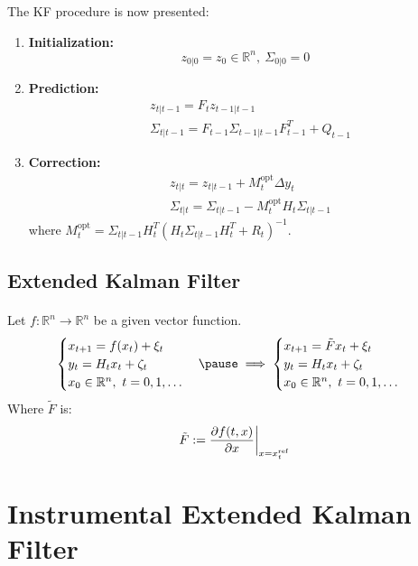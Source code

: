 \documentclass{beamer}
\theoremstyle{definition}
\theoremstyle{remark}
\theoremstyle{example}
\newif\ifinsection
\newif\ifinsubsection
\let\oldsection\section
\renewcommand{\section}{%
  \global\insectiontrue%
  \global\insubsectionfalse%
  \oldsection}
\let\oldsubsection\subsection
\renewcommand{\subsection}{%
  \global\insubsectiontrue%
  \oldsubsection}
\newcommand {\aframe}[1] {%
  \begin{frame}
    \ifinsection\frametitle{\secname}\fi
    \ifinsubsection\framesubtitle{\subsecname}\fi
  #1
  \end{frame}
}
\begin{document}
\aframe{
The KF procedure is now presented:
\begin{enumerate}
  \item \textbf{Initialization: }
  \[
  z_{0|0}=z_0\in \mathbb{R}^n, \ \Sigma_{0|0}=0
  \]
  \item \textbf{Prediction: }
  \[
  \begin{split}
    &z_{t|t-1}=F_tz_{t-1|t-1}\\
    &\Sigma_{t|t-1}=F_{t-1}\Sigma_{t-1|t-1}F_{t-1}^T+Q_{t-1}
  \end{split}
  \]
  \item \textbf{Correction: }
  \[
  \begin{split}
    &z_{t | t}=z_{t | t-1}+M_{t}^{\text{opt}} \Delta y_{t} \\
    &\Sigma_{t | t}=\Sigma_{t | t-1}-M_{t}^{\text{opt}} H_{t} \Sigma_{t | t-1}
  \end{split}
  \]
  where ${M_{t}^{\text {opt}}=\Sigma_{t | t-1} H_{t}^{T}\left(H_{t} \Sigma_{t | t-1} H_{t}^{T}+R_{t}\right)^{-1}}$.
\end{enumerate}
}

\subsection{Extended Kalman Filter}
\aframe{
  Let $f:\mathbb{R}^n \rightarrow \mathbb{R}^n$ be a given vector function.
\begin{equation}
  \begin{cases}
    x_{t+1}=f(x_t) + \xi_t&\\
    y_t=H_tx_t+\zeta_t&\\
    x_0\in \mathbb{R}^n, \ t=0,1,\ldots &
  \end{cases}
  \pause \implies
  \begin{cases}
    x_{t+1}=\tilde{F}x_t + \xi_t&\\
    y_t=H_tx_t+\zeta_t &\\
    x_0\in \mathbb{R}^n, \ t=0,1,\ldots &
  \end{cases}
\end{equation}
Where $\tilde{F}$ is:
\[
\tilde{F}:=\dfrac{\partial f(t,x)}{\partial x}\bigg|_{x=x^{{\rm ref}}_t}
\]
}

\section{Instrumental Extended Kalman Filter}
\end{document}
